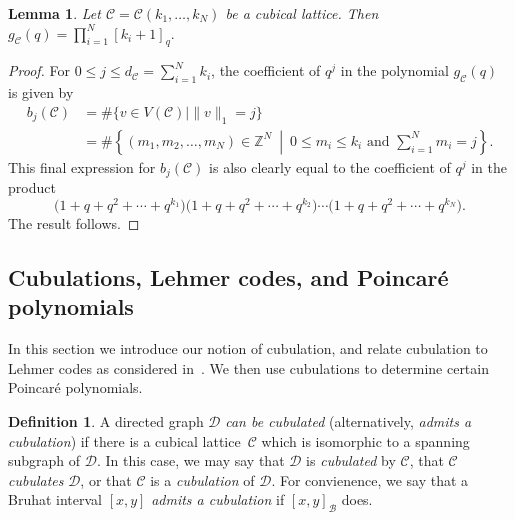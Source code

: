 \documentclass[11pt]{amsart}
\theoremstyle{plain}
\newtheorem{lemma}[thm]{Lemma}
\theoremstyle{definition}
\newtheorem{definition}[thm]{Definition}
\newcommand{\cC}{\mathcal{C}}
\newcommand{\cD}{\mathcal{D}}
\newcommand{\Z}{\mathbb{Z}}
\newcommand{\N}{\mathbb{N}}
\newcommand{\cB}{\mathcal B}
\numberwithin{equation}{subsection}
\begin{document}
%



\begin{lemma}\label{lem:cubicalQuantum}
  Let $\cC = \cC(k_1, \dots, k_N)$ be a cubical lattice.
  Then %
  $
		g_\cC(q)=
    \prod_{i=1}^N [k_i + 1]_q.
  $
\end{lemma}
\begin{proof} For $0 \leq j \leq d_\cC = \sum_{i=1}^N k_i$, the coefficient of $q^j$ in the polynomial $g_\cC(q)$ is given by
\begin{align*}
	b_j(\cC)
	&=%
	\#
	\{
		v \in V(\cC)
	\mid
		\|v\|_1 = j
	\}
	\\
	&=%
	\#
	\left\{
		(m_1,m_2,\ldots,m_N) \in \Z^N
	\ \middle| \ 
		0 \leq m_i \leq k_i
		\text{ and }
		\sum_{i=1}^N m_i = j
	\right\}.
\end{align*}
This final expression for $b_j(\cC)$ is also clearly equal to the coefficient of $q^j$ in the product 
\[
	\bigl(1+q+q^2+ \cdots +q^{k_1}\bigr)
	\bigl(1+q+q^2+ \cdots +q^{k_2}\bigr)
	\cdots
	\bigl(1+q+q^2+ \cdots +q^{k_N}\bigr).
\]
The result follows.
\end{proof}

\subsection{Cubulations, Lehmer codes, and Poincar\'e polynomials}\label{sec:cubulationPoincare}

In this section we introduce our notion of cubulation, and relate cubulation to Lehmer codes as considered in~\cite{Bolognini2025,SentinelliZatti,GaetzGao}. We then use cubulations to determine certain Poincar\'e polynomials.


\begin{definition}%
A directed graph $\cD$ \emph{can be cubulated} (alternatively, \emph{admits a cubulation}) if there is a cubical lattice~$\cC$ which is isomorphic to a spanning subgraph of $\cD$. In this case, we may say that $\cD$ is \emph{cubulated} by $\cC$, that $\cC$ \emph{cubulates} $\cD$, or that $\cC$ is a \emph{cubulation} of $\cD$. 
For convienence, we say that a Bruhat interval $[x,y]$ \emph{admits a cubulation} if $[x,y]_\cB$ does.
\end{definition}
\end{document}
